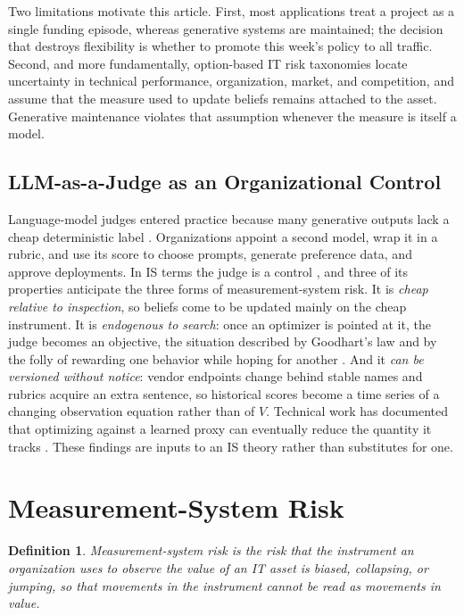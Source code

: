 \documentclass[acmsmall,screen,review,anonymous]{acmart}
\theoremstyle{acmdefinition}
\newtheorem{construct}{Definition}
\begin{document}
Two limitations motivate this article. First, most applications treat a project as a single funding episode, whereas generative systems are maintained; the decision that destroys flexibility is whether to promote this week's policy to all traffic. Second, and more fundamentally, option-based IT risk taxonomies locate uncertainty in technical performance, organization, market, and competition, and assume that the measure used to update beliefs remains attached to the asset. Generative maintenance violates that assumption whenever the measure is itself a model.

\subsection{LLM-as-a-Judge as an Organizational Control}

Language-model judges entered practice because many generative outputs lack a cheap deterministic label \citep{zheng2023}. Organizations appoint a second model, wrap it in a rubric, and use its score to choose prompts, generate preference data, and approve deployments. In IS terms the judge is a control \citep{ouchi1979}, and three of its properties anticipate the three forms of measurement-system risk. It is \emph{cheap relative to inspection}, so beliefs come to be updated mainly on the cheap instrument. It is \emph{endogenous to search}: once an optimizer is pointed at it, the judge becomes an objective, the situation described by Goodhart's law \citep{manheim2018} and by the folly of rewarding one behavior while hoping for another \citep{kerr1975}. And it \emph{can be versioned without notice}: vendor endpoints change behind stable names and rubrics acquire an extra sentence, so historical scores become a time series of a changing observation equation rather than of $V$. Technical work has documented that optimizing against a learned proxy can eventually reduce the quantity it tracks \citep{gao2023}. These findings are inputs to an IS theory rather than substitutes for one.

\section{Measurement-System Risk}\label{sec:msr}

\begin{construct}
\emph{Measurement-system risk} is the risk that the instrument an organization uses to observe the value of an IT asset is biased, collapsing, or jumping, so that movements in the instrument cannot be read as movements in value.
\end{construct}
\end{document}
